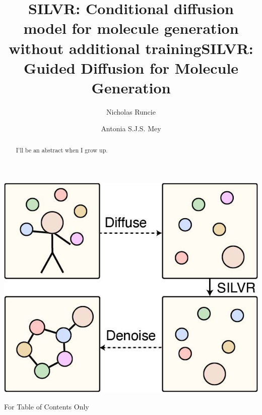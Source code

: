 \documentclass[journal=jacsat,manuscript=article]{achemso}
\author{Nicholas Runcie}
\author{Antonia S.J.S. Mey}
\title[SILVR: Molecular Generation for binding modes]
  {SILVR: Conditional diffusion model for molecule generation without additional training}
\title[SILVR: Molecular Generation for binding modes]
  {SILVR: Guided Diffusion for Molecule Generation}
\begin{document}
\begin{tocentry}
\centering
    \includegraphics{paper/Figures/TOC/TOC_stickman_to_mol.jpg}
    \caption{For Table of Contents Only}
    \label{fig:toc}
\end{tocentry}

\begin{abstract}
I'll be an abstract when I grow up. 
\end{abstract}

\end{document}

